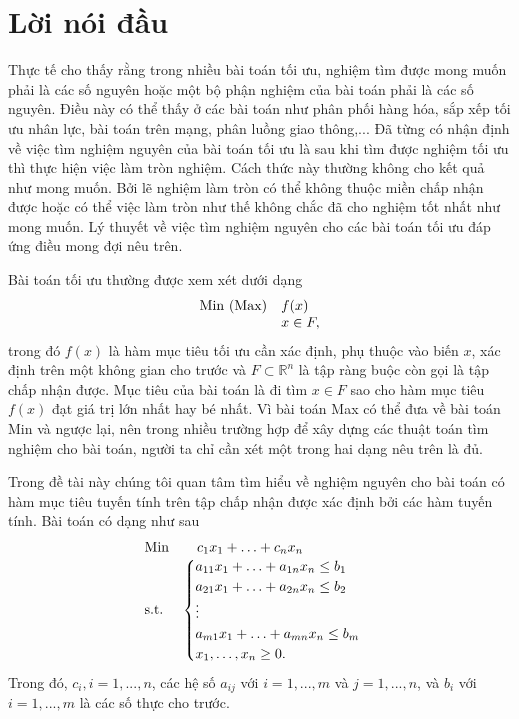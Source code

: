 \documentclass[12pt,a4paper]{report}
\begin{document}
\chapter*{Lời nói đầu}
\thispagestyle{fancy}
\renewcommand{\baselinestretch}{1.2}
Thực tế cho thấy rằng trong nhiều bài toán tối ưu, nghiệm tìm được mong muốn phải là các số nguyên hoặc một bộ phận nghiệm của bài toán phải là các số nguyên. Điều này có thể thấy ở các bài toán như phân phối hàng hóa, sắp xếp tối ưu nhân lực, bài toán trên mạng, phân luồng giao thông,...
Đã từng có nhận định về việc tìm nghiệm nguyên của bài toán tối ưu là sau khi tìm được nghiệm tối ưu thì thực hiện việc làm tròn nghiệm. Cách thức này thường không cho kết quả như mong muốn. Bởi lẽ nghiệm làm tròn có thể không thuộc miền chấp nhận được hoặc  có thể việc làm tròn như thế không chắc đã cho nghiệm tốt nhất như mong muốn. Lý thuyết về việc tìm nghiệm nguyên cho các bài toán tối ưu đáp ứng điều mong đợi nêu trên.

Bài toán tối ưu thường được xem xét dưới dạng 
$$
\begin{array}{ll}
{\rm Min\ (Max)}& f(x)\\
&x \in F,
\end{array}
$$
trong đó $f(x)$ là hàm mục tiêu tối ưu cần xác định, phụ thuộc vào biến $x$, xác định trên một không gian cho trước và $F \subset \mathbb{R}^n$ là tập ràng buộc còn gọi là tập chấp nhận được. Mục tiêu của bài toán là đi tìm $x\in F$ sao cho hàm mục tiêu $f(x)$ đạt giá trị lớn nhất hay bé nhất.
Vì bài toán Max có thể đưa về bài toán Min và ngược lại, nên trong nhiều trường hợp để xây dựng các thuật toán tìm nghiệm cho bài toán, người ta chỉ cần xét một trong hai dạng nêu trên là đủ.



Trong đề tài này chúng tôi quan tâm tìm hiểu về nghiệm nguyên cho bài toán có hàm mục tiêu tuyến tính trên tập chấp nhận được xác định bởi các hàm tuyến tính. Bài toán có dạng như sau
$$
\begin{array}{ll}
{\rm Min}&\quad c_1x_1+\ldots+c_nx_n\\
{\rm s.t.}&\begin{cases}
a_{11}x_1+\ldots+a_{1n}x_n \le b_1\\
a_{21}x_1+\ldots+a_{2n}x_n \le b_2\\
\vdots\\
a_{m1}x_1+\ldots+a_{mn}x_n \le b_m\\
x_1, \ldots, x_n \ge 0.
\end{cases}
\end{array}
$$
Trong đó, $c_i, i=1,...,n$, các hệ số $a_{ij}$ với $i=1,...,m$ và $j=1,...,n$, và $b_i$ với $i=1,...,m$ là các số thực cho trước.
\end{document}
